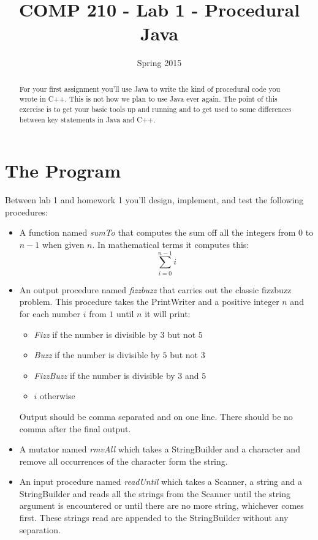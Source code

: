 \documentclass[]{tufte-handout}
\title{COMP 210 - Lab 1 - Procedural Java}
\date{Spring 2015}
\begin{document}
\maketitle

\begin{abstract}
For your first assignment you'll use Java to write the kind of procedural code you wrote in C++. This is not how we plan to use Java ever again. The point of this exercise is to get your basic tools up and running and to get used to some differences between key statements in Java and C++.
\end{abstract}

\section{The Program}

Between lab 1 and homework 1 you'll design, implement, and test the following procedures:
\begin{itemize}
\item A function named \textit{sumTo} that computes the sum off all the integers from $0$ to $n-1$ when given $n$. In mathematical terms it computes this:
\[
\sum\limits_{i=0}^{n-1} i 
\] 

\item An output procedure named \textit{fizzbuzz} that carries out the classic fizzbuzz problem. This procedure takes the PrintWriter and a positive integer $n$ and for each number $i$ from $1$ until $n$ it will print:
\begin{itemize}
\item \textit{Fizz} if the number is divisible by $3$ but not $5$
\item \textit{Buzz} if the number is divisible by $5$ but not $3$
\item \textit{FizzBuzz} if the number is divisible by $3$ and $5$
\item $i$ otherwise
\end{itemize}
Output should be comma separated and on one line. There should be no comma after the final output. 

\item A mutator named \textit{rmvAll} which takes a StringBuilder and a character and remove all occurrences of the character form the string. 

\item An input procedure named \textit{readUntil} which takes a Scanner, a string and a StringBuilder and reads all the strings from the Scanner until the string argument is encountered or until there are no more string, whichever comes first. These strings read are appended to the StringBuilder without any separation. 
\end{itemize}
\end{document}
